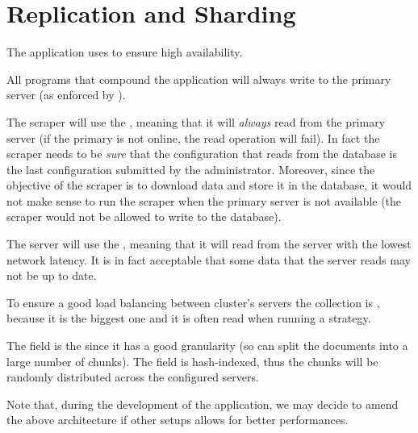 \section{Replication and Sharding}\label{sec:distributed}

The application uses  to ensure high availability.

All programs that compound the application will always write to the primary
server (as enforced by \mongodb).

The scraper will use the  ,
meaning that it will \emph{always} read from the primary server (if the primary
is not online, the read operation will fail). In fact the scraper needs to be
\emph{sure} that the configuration that reads from the database is the last
configuration submitted by the administrator. Moreover, since the objective of
the scraper is to download data and store it in the database, it would not make
sense to run the scraper when the primary server is not available (the scraper
would not be allowed to write to the database).

The server will use the  ,
meaning that it will read from the server with the lowest network latency. It is
in fact acceptable that some data that the server reads may not be up to date.

To ensure a good load balancing between cluster's servers the
 collection is , because it is the biggest
one and it is often read when running a strategy.

The  field is the  since it has a good
granularity (so \mongodb{} can split the documents into a large number of
chunks). The field is hash-indexed, thus the chunks will be randomly distributed
across the configured servers.

Note that, during the development of the application, we may decide to amend the
above architecture if other setups allows for better performances.
